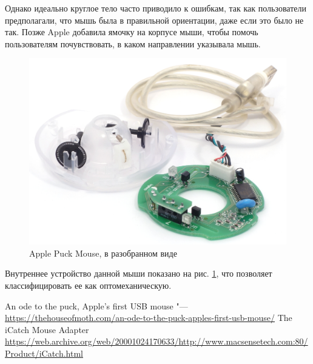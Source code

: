 \documentclass[11pt, a4paper]{article}
\begin{document}
Однако идеально круглое тело часто приводило к ошибкам, так как пользователи предполагали, что мышь была в правильной ориентации, даже если это было не так. Позже Apple добавила ямочку на корпусе мыши, чтобы помочь пользователям почувствовать, в каком направлении указывала мышь.
\begin{figure}[h]
    \centering
    \includegraphics[scale=0.6]{1998_apple_puck/apple62.jpg}
    \caption{Apple Puck Mouse, в разобранном виде}
    \label{fig:inside}
\end{figure}

Внутреннее устройство данной мыши показано на рис. \ref{fig:inside}, что позволяет классифицировать  ее как оптомеханическую.

\begin{thebibliography}{9}

     An ode to the puck, Apple's first USB mouse "--- \url{https://thehouseofmoth.com/an-ode-to-the-puck-apples-first-usb-mouse/} 
     The iCatch Mouse Adapter \url{https://web.archive.org/web/20001024170633/http://www.macsensetech.com:80/Product/iCatch.html}
\end{thebibliography}
\end{document}
